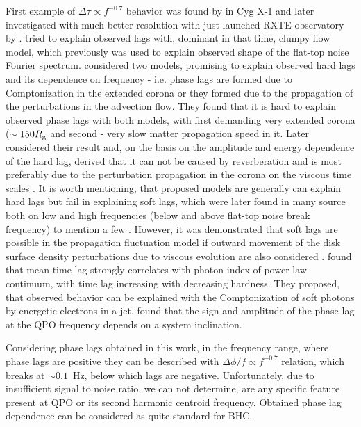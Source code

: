 \documentclass[a4paper,fleqn,usenatbib]{mnras}
\begin{document}
{First example of $\Delta \tau \propto f^{-0.7}$ behavior was found by \citet{1989Natur.342..773M} in Cyg X-1 and later investigated with much better resolution with just launched RXTE observatory by \citet{1999ApJ...517..355N}. 
\citet{1989Natur.342..773M} tried to explain observed lags with, dominant in that time, clumpy flow model, which previously was used to explain observed shape of the flat-top noise Fourier spectrum.
\citet{1999ApJ...515..726N} considered two models, promising to explain observed hard lags and its dependence on frequency - i.e. phase lags are formed due to Comptonization in the extended corona or they formed due to the propagation of the perturbations in the advection flow.  
They found that it is hard to explain observed phase lags with both models, with first demanding very extended corona ($\sim150 R_{\rm g}$ and second - very slow matter propagation speed in it.
Later \citet{2001MNRAS.327..799K} considered their result and, on the basis on the amplitude and energy dependence of the hard lag, derived that it can not be caused by reverberation and is most preferably due to the perturbation propagation in the corona on the viscous time scales \citep[see also][on simulations results]{2006MNRAS.367..801A}.
It is worth mentioning, that proposed models are generally can explain hard lags but fail in explaining soft lags, which were later found in many source both on low and high frequencies (below and above flat-top noise break frequency) to mention a few \citep[][]{2010MNRAS.407.2166G, 2012MNRAS.427.2985C, 2017MNRAS.465.1926Y, 2017MNRAS.464.2643V}.
However, it was demonstrated that soft lags are possible in the propagation fluctuation model if outward movement of the disk surface density perturbations due to viscous evolution are also considered \citep{2017arXiv170707578M}.  
\citet{2018MNRAS.473.4644R} found that mean time lag strongly correlates with photon index of power law continuum, with time lag increasing with decreasing hardness. 
They proposed, that observed behavior can be explained with the Comptonization of soft photons by energetic electrons in a jet.
\citet{2017MNRAS.464.2643V} found that the sign and amplitude of the phase lag at the QPO frequency depends on a system inclination.

Considering phase lags obtained in this work, in the frequency range, where phase lags are positive they can be described with  $\Delta \phi / f \propto f^{-0.7}$ relation, which breaks at $\sim 0.1$~Hz, below which lags are negative.
Unfortunately, due to insufficient signal to noise ratio, we can not determine, are any specific feature present at QPO or its second harmonic centroid frequency.    
Obtained phase lag dependence can be considered as quite standard for BHC.
}
\end{document}

